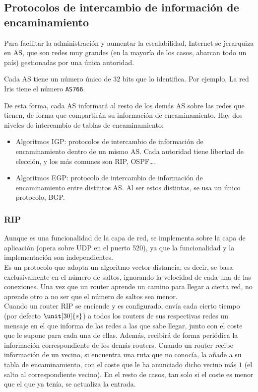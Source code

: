\subsection{Protocolos de intercambio de información de encaminamiento}

Para facilitar la administración y aumentar la escalabilidad, Internet se jerarquiza en \acrfull{AS}, que son redes muy grandes (en la mayoría de los casos, abarcan todo un país) gestionadas por una única autoridad.
\begin{observacion}
Cada \acrshort{AS} tiene un número único de $32$ bits que lo identifica. Por ejemplo, La red Iris tiene el número \verb|AS766|.
\end{observacion}

De esta forma, cada \acrshort{AS} informará al resto de los demás \acrshort{AS} sobre las redes que tienen, de forma que compartirán su información de encaminamiento. Hay dos niveles de intercambio de tablas de encaminamiento:
\begin{itemize}
    \item Algoritmos \acrfull{IGP}: protocolos de intercambio de información de encaminamiento dentro de un mismo \acrshort{AS}. Cada autoridad tiene libertad de elección, y los más comunes son \acrshort{RIP}, \acrshort{OSPF}\ldots.

    \item Algoritmos \acrfull{EGP}: protocolo de intercambio de información de encaminamiento entre distintos \acrshort{AS}. Al ser estos distintas, se usa un único protocolo, \acrshort{BGP}.
\end{itemize}

\subsubsection{\acrfull{RIP}}

Aunque es una funcionalidad de la capa de red, se implementa sobre la capa de aplicación (opera sobre \acrshort{UDP} en el puerto 520), ya que la funcionalidad y la implementación son independientes.\\

Es un protocolo que adopta un algoritmo vector-distancia; es decir, se basa exclusivamente en el número de saltos, ignorando la velocidad de cada una de las conexiones. Una vez que un router aprende un camino para llegar a cierta red, no aprende otro a no ser que el número de saltos sea menor.\\

Cuando un router RIP se enciende y es configurado, envía cada cierto tiempo (por defecto $\unit[30]{s}$) a todos los routers de sus respectivas redes un mensaje en el que informa de las redes a las que sabe llegar, junto con el coste que le supone para cada una de ellas. Además, recibirá de forma periódica la información correspondiente de los demás routers. Cuando un router recibe información de un vecino, si encuentra una ruta que no conocía, la añade a su tabla de encaminamiento, con el coste que le ha anunciado dicho vecino más $1$ (el salto al correspondiente vecino). En el resto de casos, tan solo si el coste es menor que el que ya tenía, se actualiza la entrada.\\

